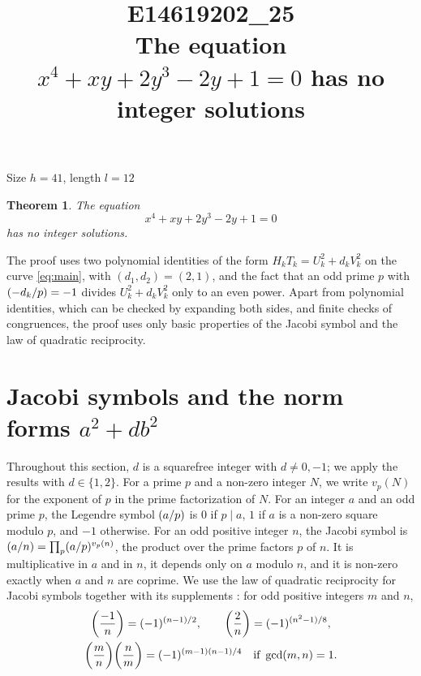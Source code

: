 \documentclass[11pt]{article}
\title{\textbf{E14619202\_25}\\[4pt] {\Large The equation $x^{4}+xy+2y^{3}-2y+1=0$ has no integer solutions}}
\author{}
\date{}
\newtheorem{theorem}{Theorem}
\newcommand{\leg}[2]{\mathchoice{\biggl(\dfrac{#1}{#2}\biggr)}{(#1/#2)}{(#1/#2)}{(#1/#2)}}
\begin{document}
\maketitle
\vspace{-8ex}
\begin{center}
Size $h=41$, length $l=12$
\end{center}

\begin{theorem}\label{thm:main}
The equation
\begin{equation}\label{eq:main}
x^{4}+xy+2y^{3}-2y+1=0
\end{equation}
has no integer solutions.
\end{theorem}

The proof uses two polynomial identities of the form $H_kT_k=U_k^2+d_kV_k^2$ on the curve \eqref{eq:main}, with $(d_1,d_2)=(2,1)$, and the fact that an odd prime $p$ with $\leg{-d_k}{p}=-1$ divides $U_k^2+d_kV_k^2$ only to an even power. Apart from polynomial identities, which can be checked by expanding both sides, and finite checks of congruences, the proof uses only basic properties of the Jacobi symbol and the law of quadratic reciprocity.

\section{Jacobi symbols and the norm forms $a^2+db^2$}

Throughout this section, $d$ is a squarefree integer with $d\neq0,-1$; we apply the results with $d\in\{1,2\}$. For a prime $p$ and a non-zero integer $N$, we write $v_p(N)$ for the exponent of $p$ in the prime factorization of $N$. For an integer $a$ and an odd prime $p$, the Legendre symbol $\leg{a}{p}$ is $0$ if $p\mid a$, $1$ if $a$ is a non-zero square modulo $p$, and $-1$ otherwise. For an odd positive integer $n$, the Jacobi symbol is $\leg{a}{n}=\prod_p\leg{a}{p}^{v_p(n)}$, the product over the prime factors $p$ of $n$. It is multiplicative in $a$ and in $n$, it depends only on $a$ modulo $n$, and it is non-zero exactly when $a$ and $n$ are coprime. We use the law of quadratic reciprocity for Jacobi symbols together with its supplements \cite[Chapter~5, \S2]{IR}: for odd positive integers $m$ and $n$,
\begin{gather*}
\leg{-1}{n}=(-1)^{(n-1)/2},\qquad\leg{2}{n}=(-1)^{(n^2-1)/8},\\
\leg{m}{n}\leg{n}{m}=(-1)^{(m-1)(n-1)/4}\quad\text{if }\gcd(m,n)=1.
\end{gather*}
\end{document}
